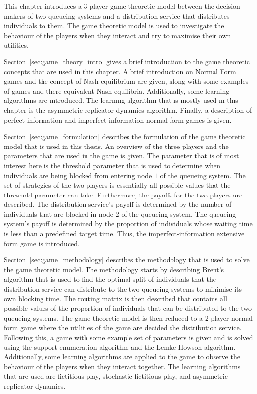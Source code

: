 This chapter introduces a 3-player game theoretic model between the decision 
makers of two queueing systems and a distribution service that distributes
individuals to them.
The game theoretic model is used to investigate the behaviour of the players
when they interact and try to maximise their own utilities.

Section~\ref{sec:game_theory_intro} gives a brief introduction to the game
theoretic concepts that are used in this chapter.
A brief introduction on Normal Form games and the concept of Nash equilibrium
are given, along with some examples of games and there equivalent Nash
equilibria.
Additionally, some learning algorithms are introduced.
The learning algorithm that is mostly used in this chapter is the
asymmetric replicator dynamics algorithm.
Finally, a description of perfect-information and imperfect-information normal
form games is given.

Section~\ref{sec:game_formulation} describes the formulation of the game
theoretic model that is used in this thesis.
An overview of the three players and the parameters that are used in the game
is given.
The parameter that is of most interest here is the threshold parameter that
is used to determine when individuals are being blocked from entering node
\(1\) of the queueing system.
The set of strategies of the two players is essentially all possible values
that the threshold parameter can take.
Furthermore, the payoffs for the two players are described.
The distribution service's payoff is determined by the number of individuals
that are blocked in node \(2\) of the queueing system.
The queueing system's payoff is determined by the proportion of individuals
whose waiting time is less than a predefined target time.
Thus, the imperfect-information extensive form game is introduced.

Section~\ref{sec:game_methodology} describes the methodology that is used to
solve the game theoretic model.
The methodology starts by describing Brent's algorithm that is used to find
the optimal split of individuals that the distribution service can distribute
to the two queueing systems to minimise its own blocking time.
The routing matrix is then described that contains all possible values of the
proportion of individuals that can be distributed to the two queueing systems.
The game theoretic model is then reduced to a 2-player normal form game where
the utilities of the game are decided the distribution service.
Following this, a game with some example set of parameters is given and
is solved using the support enumeration algorithm and the Lemke-Howson
algorithm.
Additionally, some learning algorithms are applied to the game to observe
the behaviour of the players when they interact together.
The learning algorithms that are used are fictitious play, stochastic
fictitious play, and asymmetric replicator dynamics.


